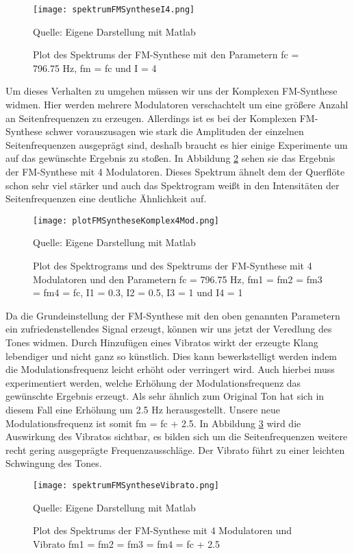 \begin{figure} [ht]
\centering
  \texttt{[image: spektrumFMSyntheseI4.png]}
\caption{Plot des Spektrums der FM-Synthese mit den Parametern fc = 796.75 Hz, fm = fc und I = 4}
\label{fig:spektrumFMSyntheseI4}
Quelle: Eigene Darstellung mit Matlab
\end{figure}

Um dieses Verhalten zu umgehen müssen wir uns der Komplexen FM-Synthese widmen. Hier werden mehrere Modulatoren verschachtelt um eine größere Anzahl an Seitenfrequenzen zu erzeugen. Allerdings ist es bei der Komplexen FM-Synthese schwer vorauszusagen wie stark die Amplituden der einzelnen Seitenfrequenzen ausgeprägt sind, deshalb braucht es hier einige Experimente um auf das gewünschte Ergebnis zu stoßen. In Abbildung \ref{fig:plotFMSyntheseKomplex4Mod} sehen sie das Ergebnis der FM-Synthese mit 4 Modulatoren. Dieses Spektrum ähnelt dem der Querflöte schon sehr viel stärker und auch das Spektrogram weißt in den Intensitäten der Seitenfrequenzen eine deutliche Ähnlichkeit auf.

\begin{figure} [ht]
\centering
  \texttt{[image: plotFMSyntheseKomplex4Mod.png]}
\caption{Plot des Spektrograms und des Spektrums der FM-Synthese mit 4 Modulatoren und den Parametern fc = 796.75 Hz, fm1 = fm2 = fm3 = fm4 = fc, I1 = 0.3, I2 = 0.5, I3 = 1 und I4 = 1}
\label{fig:plotFMSyntheseKomplex4Mod}
Quelle: Eigene Darstellung mit Matlab
\end{figure}

Da die Grundeinstellung der FM-Synthese mit den oben genannten Parametern ein zufriedenstellendes Signal erzeugt, können wir uns jetzt der Veredlung des Tones widmen. Durch Hinzufügen eines Vibratos wirkt der erzeugte Klang lebendiger und nicht ganz so künstlich. Dies kann bewerkstelligt werden indem die Modulationsfrequenz leicht erhöht oder verringert wird. Auch hierbei muss experimentiert werden, welche Erhöhung der Modulationsfrequenz das gewünschte Ergebnis erzeugt. Als sehr ähnlich zum Original Ton hat sich in diesem Fall eine Erhöhung um 2.5 Hz herausgestellt. Unsere neue Modulationsfrequenz ist somit fm = fc + 2.5. In Abbildung \ref{fig:spektrumFMSyntheseVibrato} wird die Auswirkung des Vibratos sichtbar, es bilden sich um die Seitenfrequenzen weitere recht gering ausgeprägte Frequenzausschläge. Der Vibrato führt zu einer leichten Schwingung des Tones. 

\begin{figure} [ht]
\centering
  \texttt{[image: spektrumFMSyntheseVibrato.png]}
\caption{Plot des Spektrums der FM-Synthese mit 4 Modulatoren und Vibrato fm1 = fm2 = fm3 = fm4 = fc + 2.5}
\label{fig:spektrumFMSyntheseVibrato}
Quelle: Eigene Darstellung mit Matlab
\end{figure}

